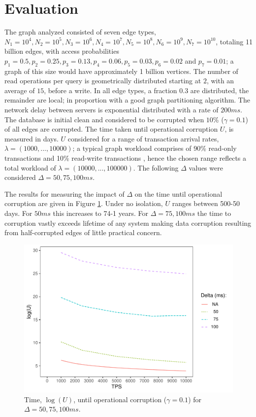\section{Evaluation}
\label{sec:evaluation}

The graph analyzed consisted of seven edge types, $N_1=10^4, N_2=10^5, N_3=10^6, N_4=10^7,  N_5=10^8, N_6=10^9, N_7=10^{10}$, totaling 11 billion edges, with access probabilities $p_1 =0.5, p_2 =0.25, p_3=0.13, p_4=0.06, p_5=0.03, p_6=0.02$ and $p_7 =0.01$; a graph of this size would have approximately 1 billion vertices. The number of read operations per query is geometrically distributed starting at $2$, with an average of $15$, before a write. In all edge types, a fraction $0.3$ are distributed, the remainder are local; in proportion with a good graph partitioning algorithm. The network delay between servers is exponential distributed with a rate of $200ms$. The database is initial clean and considered to be corrupted when $10$\% ($\gamma = 0.1$) of all edges are corrupted. The time taken until operational corruption $U$, is measured in days. $U$ considered for a range of transaction arrival rates, $\lambda = (1000, ..., 10000)$; a typical graph workload comprises of 90\% read-only transactions and 10\% read-write transactions \cite{Angles2020}, hence the chosen range reflects a total workload of $\lambda = (10000, ..., 100000)$. The following $\Delta$ values were considered $\Delta = 50, 75, 100ms$.

The results for measuring the impact of $\Delta$ on the time until operational corruption are given in Figure \ref{time-to-corruption-results}. Under no isolation, $U$ ranges between 500-50 days. For $50ms$ this increases to 74-1 years. For $\Delta = 75, 100ms$ the time to corruption vastly exceeds lifetime of any system making data corruption resulting from half-corrupted edges of little practical concern.

\begin{figure}[h]
  \centering
  \includegraphics[width=\linewidth]{./figures/delta}
  \caption{Time, $\log(U)$, until operational corruption ($\gamma = 0.1$) for $\Delta = 50, 75, 100ms$.}
  \label{time-to-corruption-results}
\end{figure}

